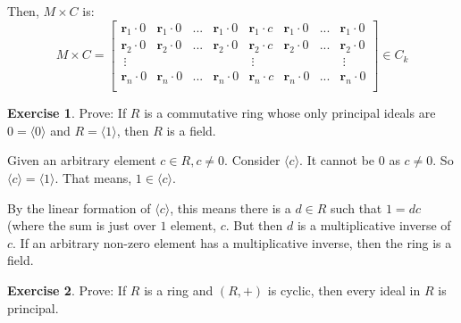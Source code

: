 \documentclass[11pt,oneside]{article}
\numberwithin{equation}{section}
\theoremstyle{definition}
\newtheorem{exercise}{Exercise}
\def\boldr{\boldsymbol{r}}
\begin{document}
\begin{solution}
\begin{enumerate}[(a)]
  Then, $M \times C$ is:
  \[
  M \times C = \begin{bmatrix}
    \boldr_1 \cdot 0 & \boldr_1 \cdot 0 & ... & \boldr_1 \cdot 0 & \boldr_1 \cdot c & \boldr_1 \cdot 0 & ... & \boldr_1 \cdot 0 \\
    \boldr_2 \cdot 0 & \boldr_2 \cdot 0 & ... & \boldr_2 \cdot 0 & \boldr_2 \cdot c & \boldr_2 \cdot 0 & ... & \boldr_2 \cdot 0 \\
    \ \vdots &        &  & & \ \vdots & & & \ \vdots \\
    \boldr_n \cdot 0 & \boldr_n \cdot 0 & ... & \boldr_n \cdot 0 & \boldr_n \cdot c & \boldr_n \cdot 0 & ... & \boldr_n \cdot 0 \\
  \end{bmatrix} \in C_k
 \]
  

  \end{enumerate}
\end{solution}
\begin{exercise}
  Prove: If $R$ is a commutative ring whose only principal ideals are
  ${0} = \langle 0 \rangle$ and $ R = \langle 1 \rangle$, then $R$ is
  a field.
\end{exercise}
\begin{solution}
  Given an arbitrary element $c \in R, c \neq 0$.
  Consider $\langle c \rangle$.  It cannot be ${0}$ as $c \neq 0$.
  So $\langle c \rangle = \langle 1 \rangle $.
  That means, $ 1 \in \langle c \rangle$.

  By the linear formation of $\langle c \rangle$, this means there is
  a $d \in R$ such that $1 = d c$ (where the sum is just over $1$
  element, $c$.  But then $d$ is a multiplicative inverse of $c$.  If
  an arbitrary non-zero element has a multiplicative inverse, then the
  ring is a field. 
  
  
\end{solution}
\begin{exercise}
  Prove: If $R$ is a ring and $(R, +)$ is cyclic, then every ideal in $R$ is principal.  
\end{exercise}
\end{document}
